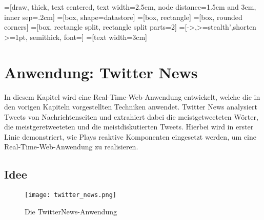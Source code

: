 
\makeatletter
{}
\makeatother

=[draw, thick, text centered, text width=2.5cm, node distance=1.5cm and 3cm, inner sep=.2cm]
=[box, shape=datastore]
=[box, rectangle]
=[box, rounded corners]
=[box, rectangle split, rectangle split parts=2]
=[->,>=stealth',shorten >=1pt, semithick, font=\footnotesize]
=[text width=3cm]

\chapter{Anwendung: Twitter News} %
\label{cha:anwendung}

In diesem Kapitel wird eine Real-Time-Web-Anwendung entwickelt, welche die in den vorigen Kapiteln vorgestellten Techniken anwendet.
Twitter News analysiert Tweets von Nachrichtenseiten und extrahiert dabei die meistgetweeteten Wörter, die meistgeretweeteten und die meistdiskutierten Tweets.
Hierbei wird in erster Linie demonstriert, wie Plays reaktive Komponenten eingesetzt werden, um eine Real-Time-Web-Anwendung zu realisieren.

\section{Idee} %
\label{sec:idee}

\begin{figure}[tb]
\centering
\texttt{[image: twitter\_news.png]}
\caption{Die TwitterNews-Anwendung}
\label{fig:die_twitternews_anwendung}
\end{figure}

